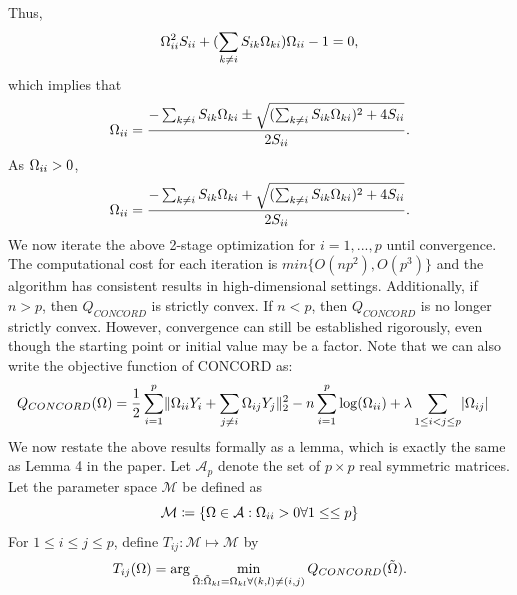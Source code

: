 \documentclass[12pt, leqno]{article}
\providecommand{\abs}[1]{\lvert#1\rvert}
\providecommand{\norm}[1]{\lVert#1\rVert}
\def\om{\ensuremath\Omega}
\begin{document}
Thus,
\begin{align*}\om_{ii}^2
                                                                 S_{ii}
                                                                 +
                                                                 (\sum_{k\not=i}
                                                                 S_{ik}\om_{ki})
  \om_{ii}                                                               -
                                                                 1 =
                                                                 0, 
\end{align*}
which implies that
\begin{align*}
\om_{ii} = \frac{- \sum_{k\not=i}
                                                                 S_{ik}\om_{ki}
  \pm \sqrt{(\sum_{k\not=i}
                                                                 S_{ik}\om_{ki})^2
  + 4 S_{ii}}}{2 S_{ii}}. 
\end{align*}
As $\om_{ii}>0$, 
\[
\om_{ii} = \frac{- \sum_{k\not=i}
                                                                 S_{ik}\om_{ki}
  + \sqrt{(\sum_{k\not=i}
                                                                 S_{ik}\om_{ki})^2
  + 4 S_{ii}}}{2 S_{ii}}.
\]
We now iterate the above 2-stage optimization for $i=1,...,p$ until
convergence. The computational cost for each iteration is
$min\{O(np^2),O(p^3)\}$ and the algorithm has consistent results in
high-dimensional settings. Additionally, if $n>p$, then $Q_{CONCORD}$
is strictly convex. If $n<p$, then $Q_{CONCORD}$ is no longer strictly
convex. However, convergence can still be established rigorously, even
though the starting point or initial value may be a factor.  
Note that we can also write the objective function of CONCORD as:
\begin{align*}
Q_{CONCORD}(\om)&= \frac{1}{2} \sum_{i=1}^p \norm{\om_{ii}Y_i + \sum_{j \not= i} \om_{ij}Y_j}_2^2
  - n \sum_{i=1}^p \log (\om_{ii}) + \lambda \sum_{1 \leq i < j \leq p}
  \abs{\om_{ij}} 
\end{align*}
We now restate the above results formally as a lemma, which is exactly the same
as Lemma 4 in the paper. Let $\mathcal{A}_p$ denote the set of $p \times p$  real
symmetric matrices. Let the parameter space $\mathcal{M}$ be defined as
\[
\mathcal{M} \coloneqq \{\om \in \mathcal{A}: \om_{ii}>0 \forall
1\leq\leq p \}
\]
For $1 \leq i \leq j \leq p$, define $T_{ij}:\mathcal{M} \mapsto
\mathcal{M}$ by 
\[
T_{ij}(\om) = \arg\min_{\tilde{\om}:\tilde{\om}_{kl}=\om_{kl}\forall
  (k,l)\not= (i,j)} Q_{CONCORD}(\tilde{\om}).
\]
\end{document}
